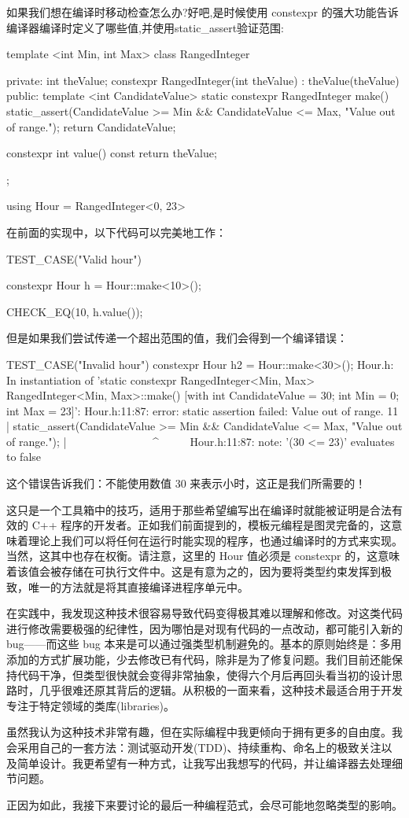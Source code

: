 如果我们想在编译时移动检查怎么办?好吧,是时候使用 constexpr 的强大功能告诉编译器编译时定义了哪些值,并使用static\_assert验证范围:

\begin{cpp}
template <int Min, int Max>
class RangedInteger{
private:
  int theValue;
  constexpr RangedInteger(int theValue) : theValue(theValue) {}
public:
  template <int CandidateValue>
  static constexpr RangedInteger make() {
    static_assert(CandidateValue >= Min && CandidateValue <= Max, "Value out of range.");
    return CandidateValue;
  }

  constexpr int value() const {
    return theValue;
  }
};

using Hour = RangedInteger<0, 23>
\end{cpp}

在前面的实现中，以下代码可以完美地工作：

\begin{cpp}
TEST_CASE("Valid hour"){
  constexpr Hour h = Hour::make<10>();

  CHECK_EQ(10, h.value());
}
\end{cpp}

但是如果我们尝试传递一个超出范围的值，我们会得到一个编译错误：

\begin{shell}
TEST_CASE("Invalid hour"){
  constexpr Hour h2 = Hour::make<30>();
}
Hour.h: In instantiation of 'static constexpr RangedInteger<Min, Max>
RangedInteger<Min, Max>::make() [with int CandidateValue = 30; int Min
= 0; int Max = 23]':
Hour.h:11:87: error: static assertion failed: Value out of range.
   11 | static_assert(CandidateValue >= Min && CandidateValue <= Max, "Value out of range.");
      |                                        ~~~~~~~~~~~~~~~^~~~~~
Hour.h:11:87: note: '(30 <= 23)' evaluates to false
\end{shell}

这个错误告诉我们：不能使用数值 30 来表示小时，这正是我们所需要的！

这只是一个工具箱中的技巧，适用于那些希望编写出在编译时就能被证明是合法有效的 C++ 程序的开发者。正如我们前面提到的，模板元编程是图灵完备的，这意味着理论上我们可以将任何在运行时能实现的程序，也通过编译时的方式来实现。当然，这其中也存在权衡。请注意，这里的 Hour 值必须是 constexpr 的，这意味着该值会被存储在可执行文件中。这是有意为之的，因为要将类型约束发挥到极致，唯一的方法就是将其直接编译进程序单元中。

在实践中，我发现这种技术很容易导致代码变得极其难以理解和修改。对这类代码进行修改需要极强的纪律性，因为哪怕是对现有代码的一点改动，都可能引入新的 bug——而这些 bug 本来是可以通过强类型机制避免的。基本的原则始终是：多用添加的方式扩展功能，少去修改已有代码，除非是为了修复问题。我们目前还能保持代码干净，但类型很快就会变得非常抽象，使得六个月后再回头看当初的设计思路时，几乎很难还原其背后的逻辑。从积极的一面来看，这种技术最适合用于开发专注于特定领域的类库(libraries)。

虽然我认为这种技术非常有趣，但在实际编程中我更倾向于拥有更多的自由度。我会采用自己的一套方法：测试驱动开发(TDD)、持续重构、命名上的极致关注以及简单设计。我更希望有一种方式，让我写出我想写的代码，并让编译器去处理细节问题。

正因为如此，我接下来要讨论的最后一种编程范式，会尽可能地忽略类型的影响。